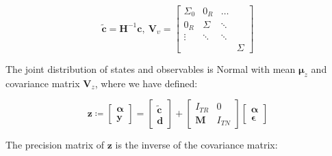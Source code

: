 \documentclass[notitlepage,a4paper,12pt]{article}
\begin{document}
$$
\tilde{\mathbf{c}}
=
\mathbf{H}^{-1} \mathbf{c}
, \:
\mathbf{V}_{\upsilon} = 
\begin{bmatrix}
    \Sigma_{0} & 0_R & \dots \\
    0_R & \Sigma & \ddots \\
    \vdots & \ddots & \ddots \\
    & & & \Sigma 
\end{bmatrix}
$$

The joint distribution of states and observables is Normal with mean $\boldsymbol{\mu}_z$ and covariance matrix $\bm{V}_z$, where we have defined: 


\begin{equation}
    \mathbf{z} 
    \coloneqq 
    \begin{bmatrix}
        \boldsymbol{\alpha} \\
        \mathbf{y}
    \end{bmatrix} 
    = 
    \begin{bmatrix}
        \tilde{\mathbf{c}} \\
        \mathbf{d} 
    \end{bmatrix}
    +
    \begin{bmatrix}
        I_{TR} & 0 \\
        \mathbf{M} & I_{TN} 
    \end{bmatrix}
    \begin{bmatrix}
        \boldsymbol{\alpha}\\
        \mathbf{\epsilon}
    \end{bmatrix} 
\end{equation}

 The precision matrix of $\mathbf{z}$ is the inverse of the covariance matrix: 
\end{document}
